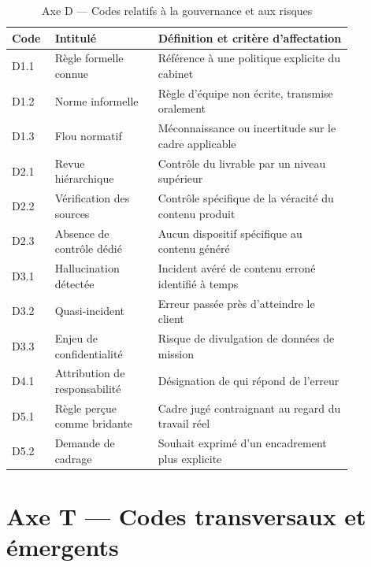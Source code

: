 \begin{table}[h]
\centering
\small
\begin{tabular}{|p{0.08\linewidth}|p{0.27\linewidth}|p{0.51\linewidth}|}
\hline
\textbf{Code} & \textbf{Intitulé} & \textbf{Définition et critère d'affectation} \\
\hline
D1.1 & Règle formelle connue & Référence à une politique explicite du cabinet \\
\hline
D1.2 & Norme informelle & Règle d'équipe non écrite, transmise oralement \\
\hline
D1.3 & Flou normatif & Méconnaissance ou incertitude sur le cadre applicable \\
\hline
D2.1 & Revue hiérarchique & Contrôle du livrable par un niveau supérieur \\
\hline
D2.2 & Vérification des sources & Contrôle spécifique de la véracité du contenu produit \\
\hline
D2.3 & Absence de contrôle dédié & Aucun dispositif spécifique au contenu généré \\
\hline
D3.1 & Hallucination détectée & Incident avéré de contenu erroné identifié à temps \\
\hline
D3.2 & Quasi-incident & Erreur passée près d'atteindre le client \\
\hline
D3.3 & Enjeu de confidentialité & Risque de divulgation de données de mission \\
\hline
D4.1 & Attribution de responsabilité & Désignation de qui répond de l'erreur \\
\hline
D5.1 & Règle perçue comme bridante & Cadre jugé contraignant au regard du travail réel \\
\hline
D5.2 & Demande de cadrage & Souhait exprimé d'un encadrement plus explicite \\
\hline
\end{tabular}
\caption{Axe D --- Codes relatifs à la gouvernance et aux risques}
\label{tab:codebook-d}
\end{table}

\section{Axe T --- Codes transversaux et émergents}

